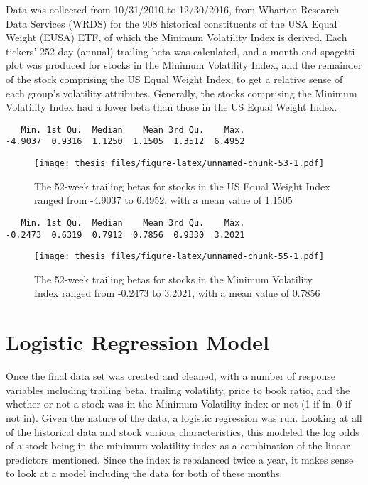 \documentclass[12pt,twoside]{reedthesis}
\theoremstyle{definition}
\theoremstyle{definition}
\theoremstyle{definition}
\theoremstyle{remark}
\begin{document}
Data was collected from 10/31/2010 to 12/30/2016, from Wharton Research
Data Services (WRDS) for the 908 historical constituents of the USA
Equal Weight (EUSA) ETF, of which the Minimum Volatility Index is
derived. Each tickers' 252-day (annual) trailing beta was calculated,
and a month end spagetti plot was produced for stocks in the Minimum
Volatility Index, and the remainder of the stock comprising the US Equal
Weight Index, to get a relative sense of each group's volatility
attributes. Generally, the stocks comprising the Minimum Volatility
Index had a lower beta than those in the US Equal Weight Index.
\begin{verbatim}
   Min. 1st Qu.  Median    Mean 3rd Qu.    Max. 
-4.9037  0.9316  1.1250  1.1505  1.3512  6.4952 
\end{verbatim}
\begin{figure}[htbp]
\centering
\texttt{[image: thesis\_files/figure-latex/unnamed-chunk-53-1.pdf]}
\caption{\label{fig:unnamed-chunk-53}The 52-week trailing betas for stocks
in the US Equal Weight Index ranged from -4.9037 to 6.4952, with a mean
value of 1.1505}
\end{figure}
\begin{verbatim}
   Min. 1st Qu.  Median    Mean 3rd Qu.    Max. 
-0.2473  0.6319  0.7912  0.7856  0.9330  3.2021 
\end{verbatim}
\begin{figure}[htbp]
\centering
\texttt{[image: thesis\_files/figure-latex/unnamed-chunk-55-1.pdf]}
\caption{\label{fig:unnamed-chunk-55}The 52-week trailing betas for stocks
in the Minimum Volatility Index ranged from -0.2473 to 3.2021, with a
mean value of 0.7856}
\end{figure}
\chapter{Logistic Regression Model}\label{logistic-regression-model}

Once the final data set was created and cleaned, with a number of
response variables including trailing beta, trailing volatility, price
to book ratio, and the whether or not a stock was in the Minimum
Volatility index or not (1 if in, 0 if not in). Given the nature of the
data, a logistic regression was run. Looking at all of the historical
data and stock various characteristics, this modeled the log odds of a
stock being in the minimum volatility index as a combination of the
linear predictors mentioned. Since the index is rebalanced twice a year,
it makes sense to look at a model including the data for both of these
months.
\end{document}

